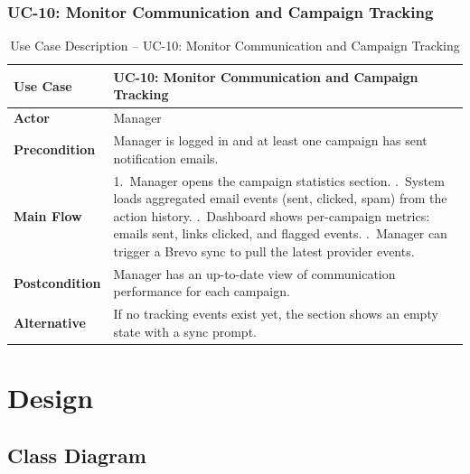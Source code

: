 \documentclass[12pt,a4paper]{report}
\begin{document}
\subsubsection{UC-10: Monitor Communication and Campaign Tracking}

\begin{table}[H]
  \centering
  \renewcommand{\arraystretch}{1.3}
  \begin{tabular}{|>{\bfseries}p{3.5cm}|p{10cm}|}
    \hline
    Use Case      & UC-10: Monitor Communication and Campaign Tracking \\
    \hline
    Actor         & Manager \\
    \hline
    Precondition  & Manager is logged in and at least one campaign has sent
                    notification emails. \\
    \hline
    Main Flow     & 1.\ Manager opens the campaign statistics section. \newline
                    2.\ System loads aggregated email events (sent, clicked, spam)
                        from the action history. \newline
                    3.\ Dashboard shows per-campaign metrics: emails sent, links
                        clicked, and flagged events. \newline
                    4.\ Manager can trigger a Brevo sync to pull the latest
                        provider events. \\
    \hline
    Postcondition & Manager has an up-to-date view of communication performance
                    for each campaign. \\
    \hline
    Alternative   & If no tracking events exist yet, the section shows an empty
                    state with a sync prompt. \\
    \hline
  \end{tabular}
  \caption{Use Case Description -- UC-10: Monitor Communication and Campaign Tracking}
  \label{tab:uc10}
\end{table}

\section{Design}

\subsection{Class Diagram}
\end{document}
